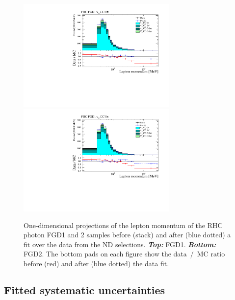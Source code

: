 \begin{figure}[ht]
  \center
  \includegraphics[keepaspectratio=true,width=0.7\textwidth,page=27]{images/BANFF/reactionCodeStacks_PrefitAndPostfit_mom.pdf}\\
  \includegraphics[keepaspectratio=true,width=0.7\textwidth,page=28]{images/BANFF/reactionCodeStacks_PrefitAndPostfit_mom.pdf}\\
  \begin{center}
    \caption[RHC photon FGD1 and 2 samples before and after a fit over
    the data from the ND280 selections]{One-dimensional projections of
      the lepton momentum of the \Gls{RHC} photon \Gls{FGD}1 and 2
      samples before (stack) and after (blue dotted) a fit over the
      data from the \Gls{ND} selections. \textbf{\textit{Top:}}
      \Gls{FGD}1. \textbf{\textit{Bottom:}} \Gls{FGD}2. The bottom
      pads on each figure show the data~/~\Gls{MC} ratio before (red)
      and after (blue dotted) the data fit.}
    \label{fig:photonrhc}
  \end{center}
\end{figure}
\clearpage

\subsection{Fitted systematic uncertainties}
\label{subsec:fittedoscillationsystematics}

